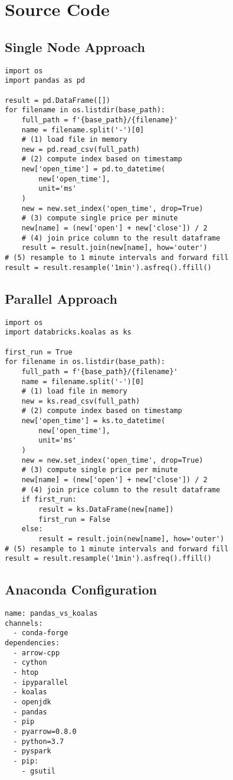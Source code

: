 \appendix

\section{Source Code}

\subsection{Single Node Approach}

\begin{verbatim}
import os
import pandas as pd

result = pd.DataFrame([])
for filename in os.listdir(base_path):
    full_path = f'{base_path}/{filename}'
    name = filename.split('-')[0]
    # (1) load file in memory
    new = pd.read_csv(full_path)
    # (2) compute index based on timestamp
    new['open_time'] = pd.to_datetime(
        new['open_time'], 
        unit='ms'
    )
    new = new.set_index('open_time', drop=True)
    # (3) compute single price per minute
    new[name] = (new['open'] + new['close']) / 2
    # (4) join price column to the result dataframe
    result = result.join(new[name], how='outer')
# (5) resample to 1 minute intervals and forward fill
result = result.resample('1min').asfreq().ffill()
\end{verbatim}

\newpage

\subsection{Parallel Approach}

\begin{verbatim}
import os
import databricks.koalas as ks

first_run = True
for filename in os.listdir(base_path):
    full_path = f'{base_path}/{filename}'
    name = filename.split('-')[0]
    # (1) load file in memory
    new = ks.read_csv(full_path)
    # (2) compute index based on timestamp
    new['open_time'] = ks.to_datetime(
        new['open_time'],
        unit='ms'
    )
    new = new.set_index('open_time', drop=True)
    # (3) compute single price per minute
    new[name] = (new['open'] + new['close']) / 2
    # (4) join price column to the result dataframe
    if first_run:
        result = ks.DataFrame(new[name])
        first_run = False
    else:
        result = result.join(new[name], how='outer')
# (5) resample to 1 minute intervals and forward fill
result = result.resample('1min').asfreq().ffill()
\end{verbatim}

\subsection{Anaconda Configuration}

\begin{verbatim}
name: pandas_vs_koalas
channels:
  - conda-forge
dependencies:
  - arrow-cpp
  - cython
  - htop
  - ipyparallel
  - koalas
  - openjdk
  - pandas
  - pip
  - pyarrow=0.8.0
  - python=3.7
  - pyspark
  - pip:
    - gsutil
\end{verbatim}